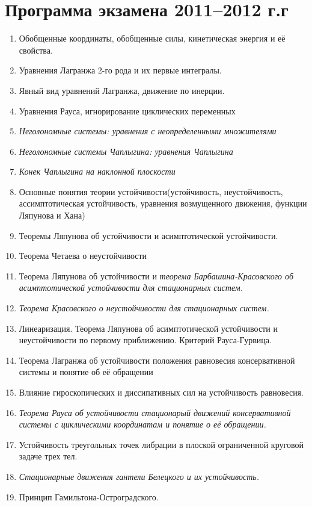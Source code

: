 \documentclass[a4paper,12pt]{article}
\begin{document}
\section*{Программа экзамена 2011--2012 г.г}
\begin{enumerate}
\item Обобщенные координаты, обобщенные силы, кинетическая энергия и
  её свойства.
\item Уравнения Лагранжа 2-го рода и их первые интегралы.
\item Явный вид уравнений Лагранжа, движение по инерции.
\item Уравнения Рауса, игнорирование циклических переменных 
\item \textit{Неголономные системы: уравнения с неопределенными множителями}
\item \textit{Неголономные системы Чаплыгина: уравнения Чаплыгина}
\item \textit{Конек Чаплыгина на наклонной плоскости}
\item Основные понятия теории устойчивости(устойчивость, неустойчивость,
  ассимптотическая устойчивость, уравнения возмущенного движения, функции Ляпунова и Хана)
\item Теоремы Ляпунова об устойчивости и асимптотической устойчивости.
\item Теорема Четаева о неустойчивости
\item Теорема Ляпунова об устойчивости и \textit{теорема Барбашина-Красовского об
асимптотической устойчивости для стационарных систем.}
\item \textit{Теорема Красовского о неустойчивости для стационарных систем.}
\item Линеаризация. Теорема Ляпунова об асимптотической устойчивости и неустойчивости 
  по первому приближению. Критерий Рауса-Гурвица.
\item Теорема Лагранжа об устойчивости положения равновесия
  консервативной системы и понятие об её обращении
\item Влияние гироскопических и диссипативных сил на устойчивость равновесия.
\item \textit{Теорема Рауса об устойчивости стационарый движений консервативной системы с циклическими координатам и понятие о её обращении.}
\item Устойчивость треугольных точек либрации в плоской ограниченной круговой задаче трех тел.
\item \textit{Стационарные движения гантели Белецкого и их устойчивость.}
\item Принцип Гамильтона-Остроградского.

\end{enumerate}
\end{document}

